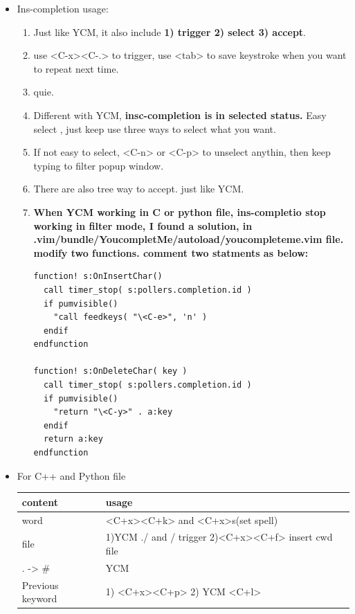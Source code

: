\documentclass[a4paper,11pt,twoside]{book}
\begin{document}
\begin{itemize}
		\item Ins-completion usage:
				\begin{enumerate}
						\item Just like YCM, it also include \textbf{1) trigger 2) select 3) accept}.
						\item use <C-x><C-.> to trigger, use <tab> to save keystroke when you want to repeat next time.
						\item <C-e> quie.
						\item Different with YCM, \textbf{insc-completion is in selected status.} Easy select , just keep use three ways to select what you want.
						\item If not easy to select, <C-n> or <C-p> to unselect anythin, then keep typing to filter popup window. 
						\item There are also tree way to accept. just like YCM.
						\item \textbf{When YCM working in C or python file, ins-completio stop working in filter mode, I found a solution, in .vim/bundle/YoucompletMe/autoload/youcompleteme.vim file. modify two functions. comment two statments as below:}

\begin{verbatim}
function! s:OnInsertChar()
  call timer_stop( s:pollers.completion.id )
  if pumvisible()
    "call feedkeys( "\<C-e>", 'n' )
  endif
endfunction 

function! s:OnDeleteChar( key )
  call timer_stop( s:pollers.completion.id )
  if pumvisible()
    "return "\<C-y>" . a:key
  endif
  return a:key
endfunction
\end{verbatim}
				\end{enumerate}


		\item For C++ and Python file \\
		
\begin{tabular}{p{}|p{}}
\hline 
content  & usage \\ 

\hline 
word & <C+x><C+k> and <C+x>s(set spell)\\ 

\hline 
file & 1)YCM ./ and / trigger 2)<C+x><C+f> insert cwd file  \\ 

\hline 
. -> \# & YCM \\

\hline
Previous keyword & 1) <C+x><C+p> 2) YCM <C+l> \\


\end{tabular}
\end{itemize}
\end{document}
